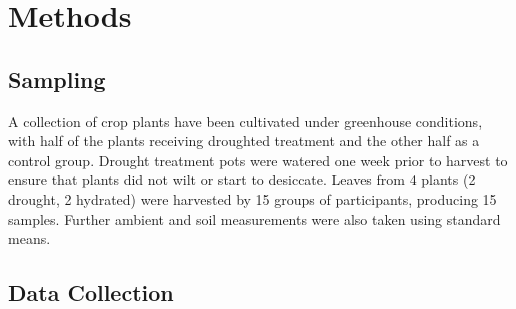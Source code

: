 \documentclass{report}
\begin{document}
\clearpage

\section{Methods}


\subsection{Sampling}

A collection of crop plants have been cultivated under greenhouse conditions, with half of the plants receiving droughted treatment and the other half as a control group. Drought treatment pots were watered one week prior to harvest to ensure that plants did not wilt or start to desiccate. Leaves from 4 plants (2 drought, 2 hydrated) were harvested by 15 groups of participants, producing 15 samples. Further ambient and soil measurements were also taken using standard means.




\subsection{Data Collection}
\end{document}
